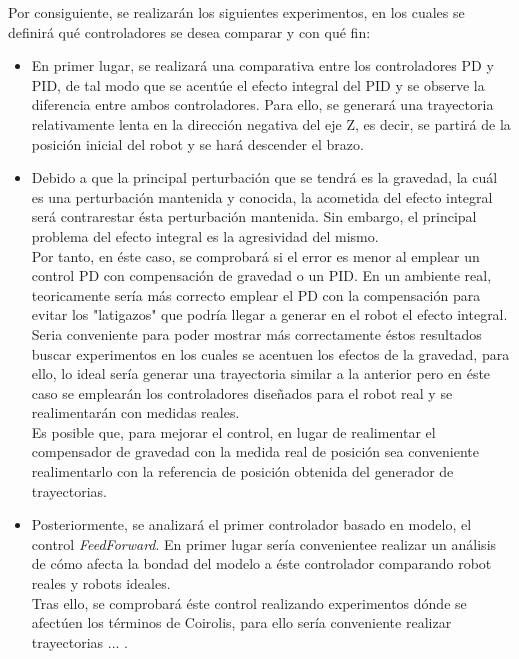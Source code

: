 Por consiguiente, se realizarán los siguientes experimentos, en los cuales se definirá qué controladores se desea comparar y con qué fin:
\begin{itemize}
	\item En primer lugar, se realizará una comparativa entre los controladores PD y PID, de tal modo que se acentúe el efecto integral del PID y se observe la diferencia entre ambos controladores. Para ello, se generará una trayectoria relativamente lenta en la dirección negativa del eje Z, es decir, se partirá de la posición inicial del robot y se hará descender el brazo. \\

	\item Debido a que la principal perturbación que se tendrá es la gravedad, la cuál es una perturbación mantenida y conocida, la acometida del efecto integral será contrarestar ésta perturbación mantenida. Sin embargo, el principal problema del efecto integral es la agresividad del mismo. \\
	Por tanto, en éste caso, se comprobará si el error es menor al emplear un control PD con compensación de gravedad o un PID. En un ambiente real, teoricamente sería más correcto emplear el PD con la compensación para evitar los "latigazos" que podría llegar a generar en el robot el efecto integral.\\
	Seria conveniente para poder mostrar más correctamente éstos resultados buscar experimentos en los cuales se acentuen los efectos de la gravedad, para ello, lo ideal sería generar una trayectoria similar a la anterior pero en éste caso se emplearán los controladores diseñados para el robot real y se realimentarán con medidas reales. \\
	Es posible que, para mejorar el control, en lugar de realimentar el compensador de gravedad con la medida real de posición sea conveniente realimentarlo con la referencia de posición obtenida del generador de trayectorias. \\

	\item Posteriormente, se analizará el primer controlador basado en modelo, el control \textit{FeedForward}. En primer lugar sería convenientee realizar un análisis de cómo afecta la bondad del modelo a éste controlador comparando robot reales y robots ideales. \\
	Tras ello, se comprobará éste control realizando experimentos dónde se afectúen los términos de Coirolis, para ello sería conveniente realizar trayectorias ... .\\


\end{itemize}
